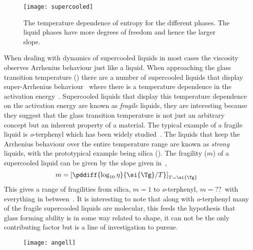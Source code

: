 \begin{figure}
    \centering
    \texttt{[image: supercooled]}
    \caption[Temperature dependence of entropy for condensed phases]{The temperature dependence of entropy for the different phases. The liquid phases have more degrees of freedom and hence the larger slope.}
    \label{fig:entropy}
\end{figure}


When dealing with dynamics of supercooled liquids in most cases the viscosity observes Arrhenius behaviour just like a liquid. When approaching the glass transition temperature (\si{\Tg}) there are a number of supercooled liquids that display super-Arrhenius behaviour~ where there is a temperature dependence in the activation energy~\cite{angell:91}. Supercooled liquids that display this temperature dependence on the activation energy are known as \emph{fragile} liquids, they are interesting because they suggest that the glass transition temperature is not just an arbitrary concept but an inherent property of a material. The typical example of a fragile liquid is \emph{o}-terphenyl which has been widely studied~\cite{greet:67}. The liquids that keep the Arrhenius behaviour over the entire temperature range are known as \emph{strong} liquids, with the prototypical example being silica (). The fragility ($m$) of a supercooled liquid can be given by the slope given in~,
\begin{equation}
    m = \left [ \pddiff{\log_{10} \eta}{\si{\Tg}/T} \right ]_{T=\si{\Tg}}
\end{equation}
This gives a range of fragilities from silica, $m = 1$ to \emph{o}-terphenyl, $m = ??$~\tocheck with everything in between~\tabref{}. It is interesting to note that along with \emph{o}-terphenyl many of the fragile supercooled liquids are molecular, this feeds the hypothesis that glass forming ability is in some way related to shape, it can not be the only contributing factor but is a line of investigation to pursue.

\begin{figure}
    \centering
    \texttt{[image: angell]}
    \label{fig:angell}
\end{figure}

